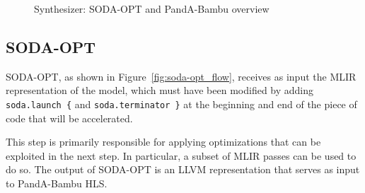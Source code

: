 \begin{figure}[t]
    \centering
    \hspace{0.03\textwidth}
    \caption{Synthesizer: SODA-OPT and PandA-Bambu overview~\cite{9786533}}
    \label{fig:synthesizer_flow}
\end{figure}

\subsection{SODA-OPT}
\label{subsec:toolchain-soda_opt}%

SODA-OPT, as shown in Figure~\ref{fig:soda-opt_flow}, receives as input the MLIR representation of the model, which must have been modified by adding \texttt{soda.launch \{} and \texttt{soda.terminator \}} at the beginning and end of the piece of code that will be accelerated.

This step is primarily responsible for applying optimizations that can be exploited in the next step.
In particular, a subset of MLIR passes can be used to do so.
The output of SODA-OPT is an LLVM representation that serves as input to PandA-Bambu HLS\@.

